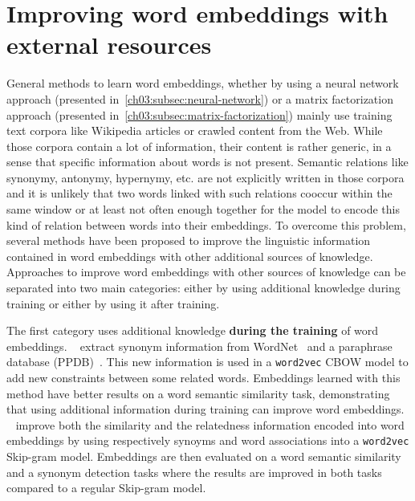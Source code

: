 \section{Improving word embeddings with external resources}
  \label{ch03:sec:external-resources}
  General methods to learn word embeddings, whether by using a neural network
  approach (presented in~\autoref{ch03:subsec:neural-network}) or a matrix
  factorization approach (presented
  in~\autoref{ch03:subsec:matrix-factorization}) mainly use training text
  corpora like Wikipedia articles or crawled content from the Web. While those
  corpora contain a lot of information, their content is rather generic, in a
  sense that specific information about words is not present. Semantic relations
  like synonymy, antonymy, hypernymy, etc. are not explicitly written in those
  corpora and it is unlikely that two words linked with such relations cooccur
  within the same window or at least not often enough together for the model to
  encode this kind of relation between words into their embeddings. To overcome
  this problem, several methods have been proposed to improve the linguistic
  information contained in word embeddings with other additional sources of
  knowledge. Approaches to improve word embeddings with other sources of
  knowledge can be separated into two main categories: either by using
  additional knowledge during training or either by using it after training.
  \medskip

  The first category uses additional knowledge \textbf{during the training} of
  word embeddings.
  \citeauthor{yudredze2014improving}~\citep{yudredze2014improving} extract
  synonym information from WordNet~\citep{miller1995wordnet} and a paraphrase
  database (PPDB)~\citep{ganitkevitch2013ppdb}. This new information is used in
  a \texttt{word2vec} CBOW model to add new constraints between some related
  words. Embeddings learned with this method have better results on a word
  semantic similarity task, demonstrating that using additional information
  during training can improve word embeddings.
  \citeauthor{kiela2015specializing}~\citep{kiela2015specializing} improve both
  the similarity and the relatedness information encoded into word embeddings by
  using respectively synoyms and word associations into a \texttt{word2vec}
  Skip-gram model. Embeddings are then evaluated on a word semantic similarity
  and a synonym detection tasks where the results are improved in both tasks
  compared to a regular Skip-gram model. \medskip

